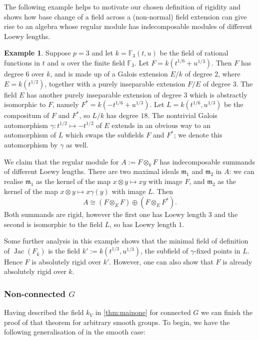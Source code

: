 \documentclass[11pt,reqno]{amsart}
\theoremstyle{definition}
\newtheorem{example}[lemma]{Example}
\theoremstyle{remark}
\theoremstyle{definition}
\theoremstyle{plain}
\DeclareMathOperator{\Jac}{Jac}
\newcommand{\F}{\mathbb{F}}
\newcommand{\m}{\mathfrak{m}}
\newcommand{\bark}{{\overline{k}}}
\begin{document}
The following example helps to motivate our chosen definition of rigidity and shows how base change of a field across a (non-normal) field extension can give rise to an algebra whose regular module has indecomposable modules of different Loewy lengths.
\begin{example}\label{rem:notbottom}
Suppose $p=3$ and let $k = \F_3(t,u)$ be the field of rational functions in $t$ and $u$ over the finite field $\F_3$. 
Let $F = k(t^{1/6} + u^{1/3})$.
Then $F$ has degree $6$ over $k$, and is made up of a Galois extension $E/k$ of degree $2$, where $E = k(t^{1/2})$, together with a purely inseparable extension $F/E$ of degree $3$.
The field $E$ has another purely inseparable extension of degree $3$ which is abstractly isomorphic to $F$, namely $F^* = k(-t^{1/6}+u^{1/3})$.
Let $L = k(t^{1/6},u^{1/3})$ be the compositum of $F$ and $F^*$, so $L/k$ has degree $18$.
The nontrivial Galois automorphism $\gamma: t^{1/2}\mapsto -t^{1/2}$ of $E$ extends in an obvious way to an automorphism of $L$ which swaps the subfields $F$ and $F^*$; we denote this automorphism by $\gamma$ as well.

We claim that the regular module for $A:=F\otimes_k F$ has indecomposable summands of different Loewy lengths.
There are two maximal ideals $\m_1$ and $\m_2$ in $A$: we can realise $\m_1$ as the kernel of the map $x\otimes y\mapsto xy$ with image $F$, and $\m_2$ as the kernel of the map $x\otimes y\mapsto x\gamma(y)$ with image $L$.
Then 
$$
A\cong (F\otimes_E F) \oplus (F\otimes_E F^*).
$$
Both summands are rigid, however the first one has Loewy length $3$ and the second is isomorphic to the field $L$, so has Loewy length $1$.

Some further analysis in this example shows that the minimal field of definition of $\Jac(F_\bark)$ is the field $k':=k(t^{1/3},u^{1/3})$, the subfield of $\gamma$-fixed points in $L$. Hence $F$ is absolutely rigid over $k'$. However, one can also show that $F$ is already absolutely rigid over $k$.
\end{example}

 \subsubsection{Non-connected \texorpdfstring{$G$}{G}}\label{sec:nonconnected}

Having described the field $k_V$ in \cref{thm:mainone} for connected $G$ 
we can finish the proof of that theorem for arbitrary smooth groups.
To begin, we have the following generalisation of \cite[I.6.16]{Jan03} in the smooth case:
\end{document}

